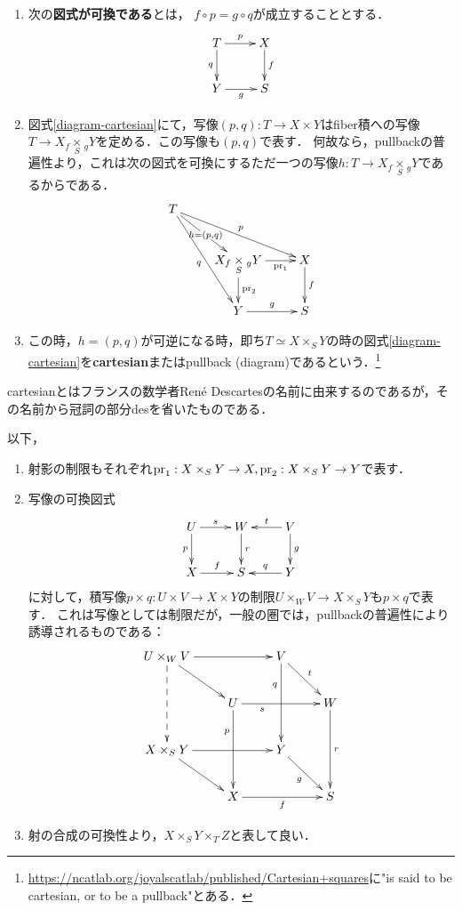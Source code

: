 \documentclass[uplatex,dvipdfmx]{jsreport}
\begin{document}
\begin{definition}[cartesian]\mbox{}
    \begin{enumerate}
        \item 次の\textbf{図式が可換である}とは，
        $f\circ p=g\circ q$が成立することとする．
        \begin{equation}
            \xymatrix{
            T\ar[r]^-p\ar[d]_-q&X\ar[d]^-f\\
            Y\ar[r]_-g&S
            }
        \label{diagram-cartesian}
        \end{equation}
        \item 図式\ref{diagram-cartesian}にて，写像$(p,q):T\to X\times Y$はfiber積への写像$T\to X_f\underset{S}{\times}{}_{g}Y$を定める．この写像も$(p,q)$で表す．
        何故なら，pullbackの普遍性より，これは次の図式を可換にするただ一つの写像$h:T\to X_f\underset{S}{\times}{}_{g}Y$であるからである．
        \[\xymatrix{
            T\ar[dr]|{h=(p,q)}\ar[drr]^-p\ar[ddr]_-q\\
            &{X_f\underset{S}{\times}{}_{g}Y}\ar[r]_-{\pr_1}\ar[d]^-{\pr_2}&X\ar[d]^-f\\
            &Y\ar[r]^-g&S
        }\]
        \item この時，$h=(p,q)$が可逆になる時，即ち$T\simeq X\times_SY$の時の図式\ref{diagram-cartesian}を\textbf{cartesian}またはpullback (diagram)であるという．\footnote{\url{https://ncatlab.org/joyalscatlab/published/Cartesian+squares}に"is said to be cartesian, or to be a pullback"とある．}
    \end{enumerate}
\end{definition}
\begin{remark}
    cartesianとはフランスの数学者René Descartesの名前に由来するのであるが，その名前から冠詞の部分desを省いたものである．
\end{remark}

\begin{notation}
    以下，
    \begin{enumerate}
        \item 射影の制限もそれぞれ$\mathrm{pr}_1:X\times_SY\to X,\mathrm{pr}_2:X\times_SY\to Y$で表す．
        \item 写像の可換図式\[\xymatrix{
            U\ar[r]^-s\ar[d]_-p&W\ar[d]^-r&V\ar[l]_-t\ar[d]^-g\\
            X\ar[r]^-f&S&Y\ar[l]_-q
        }\]
        に対して，積写像$p\times q:U\times V\to X\times Y$の制限$U\times_WV\to X\times_SY$も$p\times q$で表す．
        これは写像としては制限だが，一般の圏では，pullbackの普遍性により誘導されるものである：
        \[\xymatrix{
            U\times_WV\ar@{-->}[dd]\ar[dr]\ar[rr]&&V\ar[dr]^-t\ar[dd]_(.3)q\\
            &U\ar[rr]_(.3)s\ar[dd]_(.3)p&&W\ar[dd]^-r\\
            X\times_SY\ar[rr]\ar[dr]&&Y\ar[dr]_-g\\
            &X\ar[rr]_-f&&S
        }\]
        \item 射の合成の可換性より，$X\times_S Y\times_T Z$と表して良い．
    \end{enumerate}
\end{notation}
\end{document}
